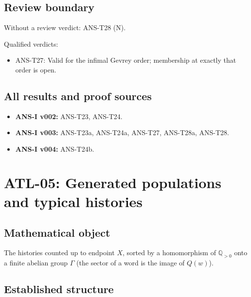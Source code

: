 \documentclass[
  11pt,
]{article}
\providecommand{\tightlist}{%
  \setlength{\itemsep}{0pt}\setlength{\parskip}{0pt}}
\begin{document}
\hypertarget{review-boundary-3}{%
\subsection{Review boundary}\label{review-boundary-3}}

Without a review verdict: ANS-T28 (N).

Qualified verdicts:

\begin{itemize}
\tightlist
\item
  ANS-T27: Valid for the infimal Gevrey order; membership at exactly
  that order is open.
\end{itemize}

\hypertarget{all-results-and-proof-sources-3}{%
\subsection{All results and proof
sources}\label{all-results-and-proof-sources-3}}

\begin{itemize}
\tightlist
\item
  \textbf{ANS-I v002:} ANS-T23, ANS-T24.
\item
  \textbf{ANS-I v003:} ANS-T23a, ANS-T24a, ANS-T27, ANS-T28a, ANS-T28.
\item
  \textbf{ANS-I v004:} ANS-T24b.
\end{itemize}

\hypertarget{atl-05-generated-populations-and-typical-histories}{%
\section{ATL-05: Generated populations and typical
histories}\label{atl-05-generated-populations-and-typical-histories}}

\hypertarget{mathematical-object-4}{%
\subsection{Mathematical object}\label{mathematical-object-4}}

The histories counted up to endpoint \(X\), sorted by a homomorphism of
\(\mathbb Q_{>0}\) onto a finite abelian group \(\Gamma\) (the sector of
a word is the image of \(Q(w)\)).

\hypertarget{established-structure-4}{%
\subsection{Established structure}\label{established-structure-4}}
\end{document}
